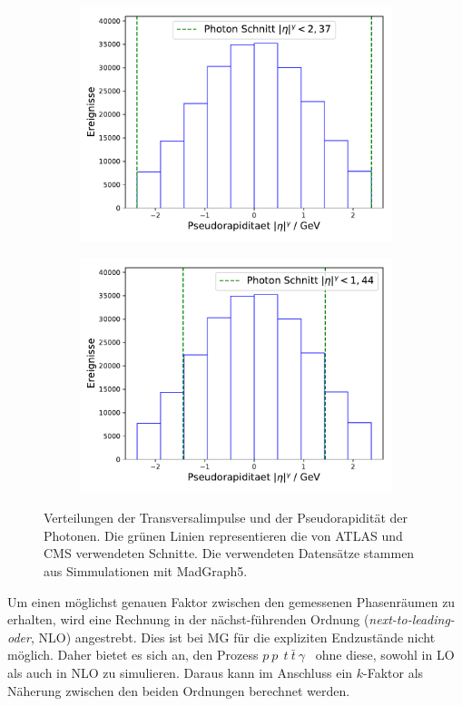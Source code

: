 \begin{figure}
\begin{subfigure}[c]{0.5\textwidth}
      \includegraphics[width=\textwidth]{Plots/photon_eta_Atlas.pdf}
    \end{subfigure}
    \begin{subfigure}[c]{0.5\textwidth}
      \includegraphics[width=\textwidth]{Plots/photon_eta_Cms.pdf}
    \end{subfigure}
    \caption{Verteilungen der Transversalimpulse und der Pseudorapidität der Photonen. Die grünen Linien representieren die von ATLAS und CMS verwendeten Schnitte. Die verwendeten Datensätze stammen aus Simmulationen mit MadGraph5.}
    \label{fig:schnitte}
\end{figure}
Um einen möglichst genauen Faktor zwischen den gemessenen Phasenräumen zu erhalten, wird eine Rechnung in der nächst-führenden Ordnung (\textit{next-to-leading-oder}, NLO) angestrebt. Dies ist bei MG für die expliziten Endzustände nicht möglich. Daher bietet es sich an, den Prozess $p~p~$\textrightarrow$~t~\bar{t}~\gamma$~ ohne diese, sowohl in LO als auch in NLO zu simulieren. Daraus kann im Anschluss ein $k$-Faktor als Näherung zwischen den beiden Ordnungen berechnet werden.\\
